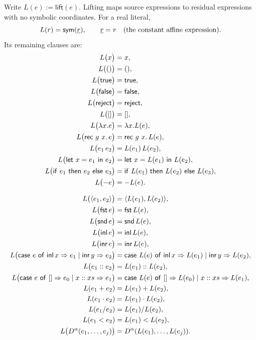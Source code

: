 \begin{definition}
Write $L(e):=\mathsf{lift}(e)$. Lifting maps source expressions to
residual expressions with no symbolic coordinates. For a real literal,
\[
  L(r)=\mathsf{sym}(\underline r),\qquad \underline r=r\quad\text{(the constant affine expression).}
\]
Its remaining clauses are:
\[
\begin{aligned}
  L\bigl(x\bigr)&=x,\\
  L\bigl(()\bigr)&=(),\\
  L\bigl(\mathsf{true}\bigr)&=\mathsf{true},\\
  L\bigl(\mathsf{false}\bigr)&=\mathsf{false},\\
  L\bigl(\mathsf{reject}\bigr)&=\mathsf{reject},\\
  L\bigl([]\bigr)&=[],\\
  L\bigl(\lambda x.e\bigr)&=\lambda x.L(e),\\
  L\bigl(\mathsf{rec}\ g\ x.\,e\bigr)&=\mathsf{rec}\ g\ x.\,L(e),\\
  L\bigl(e_1\,e_2\bigr)&=L(e_1)\,L(e_2),\\
  L\bigl(\mathsf{let}\ x=e_1\ \mathsf{in}\ e_2\bigr)&=\mathsf{let}\ x=L(e_1)\ \mathsf{in}\ L(e_2),\\
  L\bigl(\mathsf{if}\ e_1\ \mathsf{then}\ e_2\ \mathsf{else}\ e_3\bigr)&=\mathsf{if}\ L(e_1)\ \mathsf{then}\ L(e_2)\ \mathsf{else}\ L(e_3),\\
  L\bigl(-e\bigr)&=-L(e).
\end{aligned}
\]

\[
\begin{aligned}
  L\bigl(\langle e_1,e_2\rangle\bigr)&=\langle L(e_1),L(e_2)\rangle,\\
  L\bigl(\mathsf{fst}\,e\bigr)&=\mathsf{fst}\,L(e),\\
  L\bigl(\mathsf{snd}\,e\bigr)&=\mathsf{snd}\,L(e),\\
  L\bigl(\mathsf{inl}\,e\bigr)&=\mathsf{inl}\,L(e),\\
  L\bigl(\mathsf{inr}\,e\bigr)&=\mathsf{inr}\,L(e),\\
  L\bigl(\mathsf{case}\ e\ \mathsf{of}\ \mathsf{inl}\,x\Rightarrow e_1\mid\mathsf{inr}\,y\Rightarrow e_2\bigr)&=\mathsf{case}\ L(e)\ \mathsf{of}\ \mathsf{inl}\,x\Rightarrow L(e_1)\mid\mathsf{inr}\,y\Rightarrow L(e_2),\\
  L\bigl(e_1::e_2\bigr)&=L(e_1)::L(e_2),\\
  L\bigl(\mathsf{case}\ e\ \mathsf{of}\ []\Rightarrow e_0\mid x::xs\Rightarrow e_1\bigr)&=\mathsf{case}\ L(e)\ \mathsf{of}\ []\Rightarrow L(e_0)\mid x::xs\Rightarrow L(e_1),\\
  L(e_1+e_2)&=L(e_1)+L(e_2),\\
  L(e_1\cdot e_2)&=L(e_1)\cdot L(e_2),\\
  L(e_1/e_2)&=L(e_1)/L(e_2),\\
  L(e_1<e_2)&=L(e_1)<L(e_2),\\
  L\bigl(D^\alpha(e_1,\ldots,e_j)\bigr)
    &=D^\alpha(L(e_1),\ldots,L(e_j)).
\end{aligned}
\]
\end{definition}

